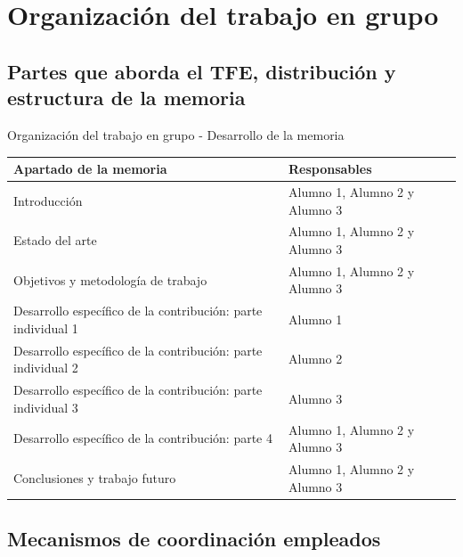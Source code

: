 \section{Organización del trabajo en
grupo}\label{organizaciuxf3n-del-trabajo-en-grupo}

\subsection{Partes que aborda el TFE, distribución y estructura de la
memoria}\label{partes-que-aborda-el-tfe-distribuciuxf3n-y-estructura-de-la-memoria}

Organización del trabajo en grupo - Desarrollo de la memoria

{\def\LTcaptype{none} %
\begin{longtable}[]{@{}
  >{\raggedright\arraybackslash}p{}
  >{\raggedright\arraybackslash}p{}@{}}
\toprule\noalign{}
\begin{minipage}[b]{\linewidth}\raggedright
Apartado de la memoria
\end{minipage} & \begin{minipage}[b]{\linewidth}\raggedright
Responsables
\end{minipage} \\
\midrule\noalign{}
\endhead
\bottomrule\noalign{}
\endlastfoot
Introducción & Alumno 1, Alumno 2 y Alumno 3 \\
Estado del arte & Alumno 1, Alumno 2 y Alumno 3 \\
Objetivos y metodología de trabajo & Alumno 1, Alumno 2 y Alumno 3 \\
Desarrollo específico de la contribución: parte individual 1 & Alumno
1 \\
Desarrollo específico de la contribución: parte individual 2 & Alumno
2 \\
Desarrollo específico de la contribución: parte individual 3 & Alumno
3 \\
Desarrollo específico de la contribución: parte 4 & Alumno 1, Alumno 2 y
Alumno 3 \\
Conclusiones y trabajo futuro & Alumno 1, Alumno 2 y Alumno 3 \\
\end{longtable}
}

\subsection{Mecanismos de coordinación
empleados}\label{mecanismos-de-coordinaciuxf3n-empleados}

